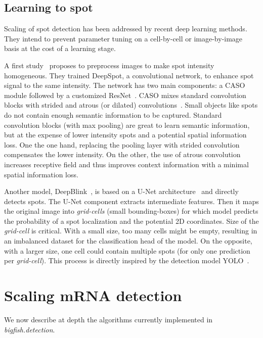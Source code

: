 \subsection{Learning to spot} \label{subsec:detection_dl}

Scaling of spot detection has been addressed by recent deep learning methods.
They intend to prevent parameter tuning on a cell-by-cell or image-by-image basis at the cost of a learning stage.

A first study~\cite{bouilhol_deepspot_2022} proposes to preprocess images to make spot intensity homogeneous.
They trained DeepSpot, a convolutional network, to enhance spot signal to the same intensity.
The network has two main components: a \ac{CASO} module followed by a customized ResNet~\cite{He_2016}.
\ac{CASO} mixes standard convolution blocks with strided and atrous (or dilated) convolutions~\cite{Hamaguchi_2018}.
Small objects like spots do not contain enough semantic information to be captured.
Standard convolution blocks (with max pooling) are great to learn semantic information, but at the expense of lower intensity spots and a potential spatial information loss.
One the one hand, replacing the pooling layer with strided convolution compensates the lower intensity.
On the other, the use of atrous convolution increases receptive field and thus improves context information with a minimal spatial information loss.

Another model, DeepBlink~\cite{eichenberger_deepblink_2021}, is based on a U-Net architecture~\cite{Ronneberger_2015} and directly detects spots.
The U-Net component extracts intermediate features.
Then it maps the original image into \emph{grid-cells} (small bounding-boxes) for which model predicts the probability of a spot localization and the potential 2D coordinates.
Size of the \emph{grid-cell} is critical.
With a small size, too many cells might be empty, resulting in an imbalanced dataset for the classification head of the model.
On the opposite, with a larger size, one cell could contain multiple spots (for only one prediction per \emph{grid-cell}).
This process is directly inspired by the detection model YOLO~\cite{Redmon_2016_CVPR}.

\section{Scaling \ac{mRNA} detection} \label{sec:method}

We now describe at depth the algorithms currently implemented in \emph{bigfish.detection}.

